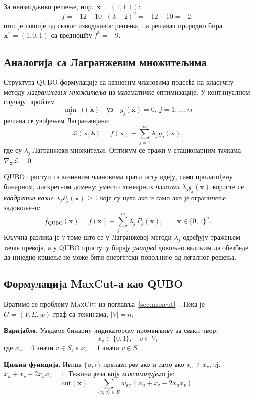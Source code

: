 За неизводљиво решење, нпр.\ $\mathbf{x} = (1,1,1)$:
\[
  f = -12 + 10\cdot(3-2)^2 = -12 + 10 = -2,
\]
што је лошије од сваког изводљивог решења, па решавач природно бира
$\mathbf{x}^* = (1, 0, 1)$ са вредношћу $f^* = -9$.

\subsection{Аналогија са Лагранжевим множитељима}

Структура QUBO формулације са казненим члановима подсећа на
класичну методу \emph{Лагранжевих множитеља} из математичке
оптимизације. У континуалном случају, проблем
\[
  \min_{\mathbf{x}}\; f(\mathbf{x})
  \quad \text{уз} \quad
  g_j(\mathbf{x}) = 0,\; j = 1, \dots, m
\]
решава се увођењем Лагранжијана:
\[
  \mathcal{L}(\mathbf{x}, \boldsymbol{\lambda})
  = f(\mathbf{x}) + \sum_{j=1}^{m} \lambda_j\, g_j(\mathbf{x}),
\]
где су $\lambda_j$ Лагранжеви множитељи. Оптимум се тражи у
стационарним тачкама $\nabla_{\mathbf{x}} \mathcal{L} = 0$.

QUBO приступ са казненим члановима прати исту идеју, само прилагођену бинарном,
дискретном домену: уместо линеарних члanova $\lambda_j g_j(\mathbf{x})$
користе се \emph{квадратне казне} $\lambda_j P_j(\mathbf{x}) \geq 0$
које су нула ако и само ако је ограничење задовољено:
\[
  f_{\mathrm{QUBO}}(\mathbf{x})
  = f(\mathbf{x}) + \sum_{j=1}^{m} \lambda_j\, P_j(\mathbf{x}),
  \qquad \mathbf{x} \in \{0,1\}^n.
\]
Кључна разлика је у томе што се у Лагранжевој методи $\lambda_j$
одређују тражењем тачке превоја, а у QUBO приступу бирају
\emph{унапред} довољно великим да обезбеде да ниједно кршење
не може бити енергетски повољније од легалног решења.

\subsection{Формулација MaxCut-а као QUBO}

Вратимо се проблему \textsc{MaxCut} из поглавља~\ref{sec:maxcut}~\cite{glover2022qubo}.
Нека је $G = (V, E, w)$ граф са тежинама, $|V| = n$.

\textbf{Варијабле.}
Уведемо бинарну индикаторску променљиву за сваки чвор:
\[
  x_v \in \{0, 1\}, \quad v \in V,
\]
где $x_v = 0$ значи $v \in S$, а $x_v = 1$ значи $v \in \bar{S}$.

\textbf{Циљна функција.}
Ивица $\{u, v\}$ прелази рез ако и само ако $x_u \neq x_v$, тј.\
$x_u + x_v - 2x_u x_v = 1$.
Тежина реза коју \emph{максимизујемо} је:
\[
  \mathrm{cut}(\mathbf{x})
  = \sum_{\{u,v\} \in E} w_{uv}\,(x_u + x_v - 2x_u x_v).
\]

